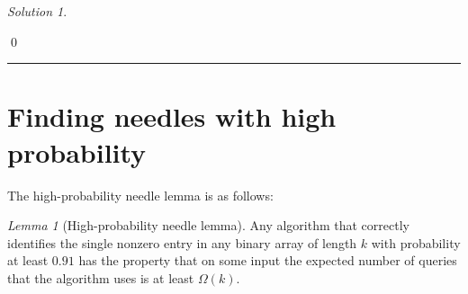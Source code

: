 \documentclass{article}
\DeclareMathOperator*{\1}{\mathbbm{1}}
\newcommand{\0}{\mathbf{0}}
\theoremstyle{definition}
\theoremstyle{remark}
\newtheorem*{solution*}{Solution}
\theoremstyle{theorem}
\newtheorem{lemma}{Lemma}
\begin{document}
\begin{solution*}
\begin{enumerate}


\end{enumerate}
\qed\par\smallskip\hrule
\end{solution*}

\section*{Finding needles with high probability}

The high-probability needle lemma is as follows:
\begin{lemma}[High-probability needle lemma]
\label{lem:hpn}
Any algorithm that
correctly identifies the single nonzero entry in any binary array of length $k$
with probability at least $0.91$
has the property that
on some input
the expected number of queries that the algorithm uses is
at least $\Omega(k)$.
\end{lemma}
\end{document}
